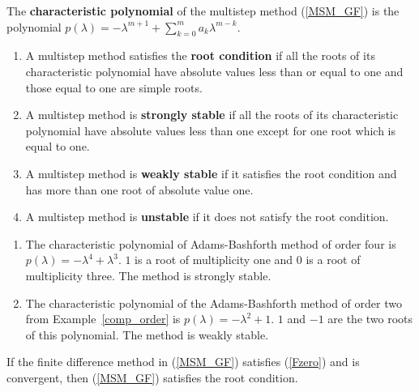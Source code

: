 \begin{defn}
The {\bfseries characteristic polynomial}
of the multistep method (\ref{MSM_GF}) is the polynomial
$\displaystyle p(\lambda) = - \lambda^{m+1} + \sum_{k=0}^m a_k \lambda^{m-k}$.
\end{defn}

\begin{defn}
\begin{enumerate}
\item A multistep method satisfies the
{\bfseries root condition} if all the roots of its
characteristic polynomial have absolute values less 
than or equal to one and those equal to one are simple roots.
\item A multistep method is {\bfseries strongly stable}
if all the roots of its characteristic polynomial have absolute values less
than one except for one root which is equal to one.
\item A multistep method is {\bfseries weakly stable}
if it satisfies the root condition and has more than one root of absolute
value one.
\item A multistep method is {\bfseries unstable} if it does
not satisfy the root condition.
\end{enumerate}
\end{defn}

\begin{eggList}\label{comp_stab}
\begin{enumerate}
\item The characteristic polynomial of
 Adams-Bashforth method of order four is
 $p(\lambda) = - \lambda^4 + \lambda^3$.  $1$ is a root of 
 multiplicity one and $0$ is a root of multiplicity three.  The method
 is strongly stable.
\item The characteristic polynomial of the
 Adams-Bashforth method of order two from Example~\ref{comp_order} is
 $p(\lambda) = -\lambda^2 + 1$.  $1$ and $-1$  are the two roots of
 this polynomial.  The method is weakly stable.
\end{enumerate}
\end{eggList}

\begin{prop}
If the finite difference method in (\ref{MSM_GF}) satisfies (\ref{Fzero})
and is convergent, then (\ref{MSM_GF}) satisfies the root condition.
\label{SimpliesRC}
\end{prop}

